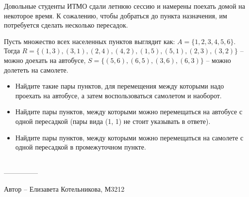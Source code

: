 \question
Довольные студенты ИТМО сдали летнюю сессию и намерены поехать домой на некоторое время. К сожалению, чтобы добраться до пункта назначения, им потребуется сделать несколько пересадок.

Пусть множество всех населенных пунктов выглядит как: $A = \{1, 2, 3, 4, 5, 6\}$.
\\
Тогда $R = \{(1, 3), (3, 1), (2, 4), (4, 2), (1, 5), (5, 1), (2, 3), (3, 2)\}$ -- можно доехать на автобусе, $S = \{(5, 6), (6, 5), (3, 6), (6, 3)\}$ -- можно долететь на самолете.

\begin{itemize}
    \item Найдите такие пары пунктов, для перемещения между которыми надо проехать на автобусе, а затем воспользоваться самолетом и наоборот.
    \item Найдите пары пунктов, между которыми можно перемещаться на автобусе с одной пересадкой (пары вида (1, 1) не стоит указывать в ответе).
    \item Найдите пары пунктов, между которыми можно перемещаться на самолете с одной пересадкой в промежуточном пункте.
\end{itemize}
\\
---------------

Автор -- Елизавета Котельникова, М3212